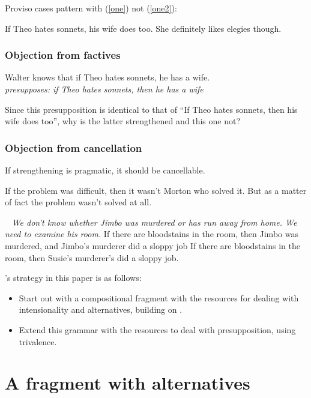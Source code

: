 \documentclass[nols,twoside,nofonts,nobib,nohyper]{tufte-handout}
\begin{document}
Proviso cases pattern with (\ref{one}) not (\ref{one2}):

\ex
If Theo hates sonnets, his wife does too. She definitely likes elegies though.
\xe

\subsubsection{Objection from factives}

\ex
Walter knows that if Theo hates sonnets, he has a wife.\\
\phantom{,}\hfill\textit{presupposes: if Theo hates sonnets, then he has a wife}
\xe

Since this presupposition is identical to that of \enquote{If Theo hates sonnets, then his wife does too}, why is the latter strengthened and this one not?

\subsubsection{Objection from cancellation}

If strengthening is pragmatic, it should be cancellable.

\ex
If the problem was difficult, then it wasn't Morton who solved it. But as a matter of fact the problem wasn't solved at all.
\xe

\pex~
\textit{We don't know whether Jimbo was murdered or has run away from home. We need to examine his room.}
\a If there are bloodstains in the room, then Jimbo was murdered, and Jimbo's murderer did a sloppy job
\a\ljudge{\#}If there are bloodstains in the room, then Susie's murderer's did a sloppy job.
\xe

\citeauthor{grove2019}'s strategy in this paper is as follows:

\begin{itemize}

    \item Start out with a compositional fragment with the resources for dealing with intensionality and alternatives, building on \citet{Charlowc,charlow2019}.

    \item Extend this grammar with the resources to deal with presupposition, using trivalence.


\end{itemize}

\section{A fragment with alternatives}
\end{document}
